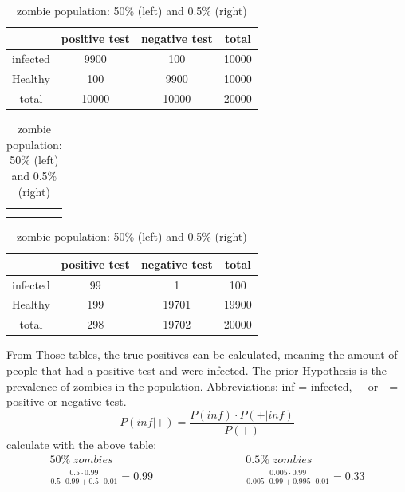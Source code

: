 \documentclass{article}
\begin{document}
\renewcommand{\arraystretch}{1.5}
\begin{table}[h]
    \centering
    \caption{zombie population: 50\% (left) and 0.5\% (right)}
    \begin{tabular}{c|c|c|c}
         & positive test & negative test & total \\
         \hline 
         infected & 9900 & 100 & 10000\\ 
         \hline 
         Healthy & 100 & 9900 & 10000 \\
         \hline 
         total & 10000 & 10000 & 20000
    \end{tabular}
    \begin{tabular}{c c}
           &    \\
           &  
    \end{tabular}
    \begin{tabular}{c|c|c|c}
         & positive test & negative test & total \\
         \hline 
         infected & 99 & 1 & 100\\ 
         \hline 
         Healthy & 199 & 19701 & 19900 \\
         \hline 
         total & 298 & 19702 & 20000
    \end{tabular}
\end{table}
\renewcommand{\arraystretch}{1}
From Those tables, the true positives can be calculated, meaning the amount of people that had a positive test and were infected. The prior Hypothesis is the prevalence of zombies in the population. Abbreviations: inf = infected, + or - = positive or negative test.
\begin{equation*}
    P(inf|+) = \frac{P(inf) \cdot P(+|inf)}{P(+)}
\end{equation*}
calculate with the above table:
\begin{equation*}
\begin{split}
    50 \% \; zombies\;\;\;\;\;\;\;\;\;\;\;\;\;\;\;\;\;\;\;\;\;\;\;\;\;\;\;\;\;\;\;\;\;\;\;\;\;\;\;\;  &  0.5\% \; zombies \\
    \frac{0.5 \cdot 0.99}{0.5 \cdot 0.99 + 0.5 \cdot 0.01} = 0.99 \;\;\;\;\;\;\;\;\;\;\;\;\;\;\;\; & \frac{0.005 \cdot 0.99}{0.005 \cdot 0.99 + 0.995 \cdot 0.01} = 0.33
\end{split}
\end{equation*}
\end{document}
